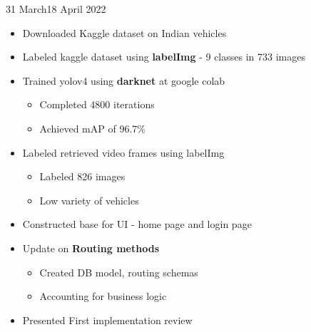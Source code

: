 \documentclass{diaryformat}
\begin{document}
\begin{workDone}{31 March}{18 April 2022}
	\begin{itemize}
		\item Downloaded Kaggle dataset on Indian vehicles
		\item Labeled kaggle dataset using \textbf{labelImg} - 9 classes in 733 images
		\item Trained yolov4 using \textbf{darknet} at google colab
		\begin{itemize}
			\item Completed 4800 iterations
			\item Achieved mAP of 96.7\%
		\end{itemize}
		\item Labeled retrieved video frames using labelImg
		\begin{itemize}
			\item Labeled 826 images
			\item Low variety of vehicles
		\end{itemize}
		\item Constructed base for UI - home page and login page
		\item Update on \textbf{Routing methods}
		\begin{itemize}
			\item Created DB model, routing schemas
			\item Accounting for business logic
		\end{itemize}		
		\item Presented First implementation review
	\end{itemize}
\end{workDone}
\end{document}
